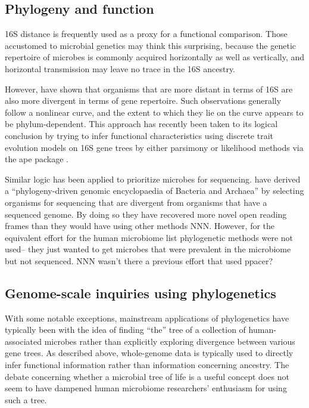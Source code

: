 \documentclass{amsart}
\begin{document}
\subsection{Phylogeny and function}

16S distance is frequently used as a proxy for a functional comparison.
Those accustomed to microbial genetics may think this surprising, because the genetic repertoire of microbes is commonly acquired horizontally as well as vertically, and horizontal transmission may leave no trace in the 16S ancestry.

However, \citep{zaneveld2010ribosomal} have shown that organisms that are more distant in terms of 16S are also more divergent in terms of gene repertoire.
Such observations generally follow a nonlinear curve, and the extent to which they lie on the curve appears to be phylum-dependent.
This approach has recently been taken to its logical conclusion by trying to infer functional characteristics using discrete trait evolution models on 16S gene trees \citep{langille2013predictive} by either parsimony \citep{kluge1969quantitative} or likelihood \citep{pagel1994detecting} methods via the ape package \citep{paradis2004ape}.

Similar logic has been applied to prioritize microbes for sequencing.
\citet{wu2009phylogeny} have derived a ``phylogeny-driven genomic encyclopaedia of Bacteria and Archaea'' by selecting organisms for sequencing that are divergent from organisms that have a sequenced genome.
By doing so they have recovered more novel open reading frames than they would have using other methods NNN.
However, for the equivalent effort for the human microbiome \cite{fodor2012most} list phylogenetic methods were not used-- they just wanted to get microbes that were prevalent in the microbiome but not sequenced.
NNN wasn't there a previous effort that used ppacer?


\subsection{Genome-scale inquiries using phylogenetics}
With some notable exceptions, mainstream applications of phylogenetics have typically been with the idea of finding ``the'' tree of a collection of human-associated microbes rather than explicitly exploring divergence between various gene trees.
As described above, whole-genome data is typically used to directly infer functional information rather than information concerning ancestry.
The debate concerning whether a microbial tree of life is a useful concept does not seem to have dampened human microbiome researchers' enthusiasm for using such a tree.
\end{document}
